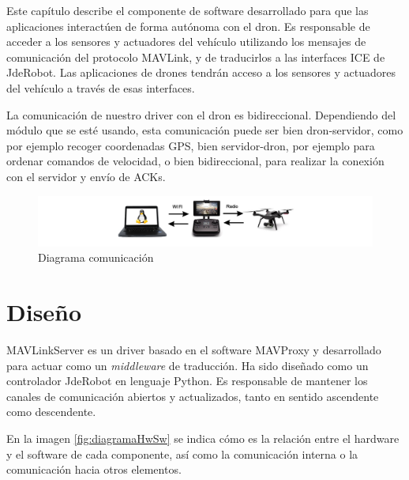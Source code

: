 Este capítulo describe el componente de software desarrollado para que las aplicaciones interactúen de forma autónoma con el dron. Es responsable de acceder a los sensores y actuadores del vehículo utilizando los mensajes de comunicación del protocolo MAVLink, y de traducirlos a las interfaces ICE de JdeRobot. Las aplicaciones de drones tendrán acceso a los sensores y actuadores del vehículo a través de esas interfaces.

La comunicación de nuestro driver con el dron es bidireccional. Dependiendo del módulo que se esté usando, esta comunicación puede ser bien dron-servidor, como por ejemplo recoger coordenadas GPS, bien servidor-dron, por ejemplo para ordenar comandos de velocidad, o bien bidireccional, para realizar la conexión con el servidor y envío de ACKs. 

\begin{figure}[H]
  \hspace*{-3.5cm}
  \includegraphics[scale=0.5]{imagenes/muySencillo.png}
  \caption{Diagrama comunicación}
  \label{fig:diagramaComunicacionServerDron1}
\end{figure}

\section{Diseño}
\label{Diseno}

MAVLinkServer es un driver basado en el software MAVProxy y desarrollado para actuar como un \textit{middleware} de traducción. Ha sido diseñado como un controlador JdeRobot en lenguaje Python. Es responsable de mantener los canales de comunicación abiertos y actualizados, tanto en sentido ascendente como descendente. 

En la imagen \ref{fig:diagramaHwSw} se indica cómo es la relación entre el hardware y el software de cada componente, así como la comunicación interna o la comunicación hacia otros elementos.

